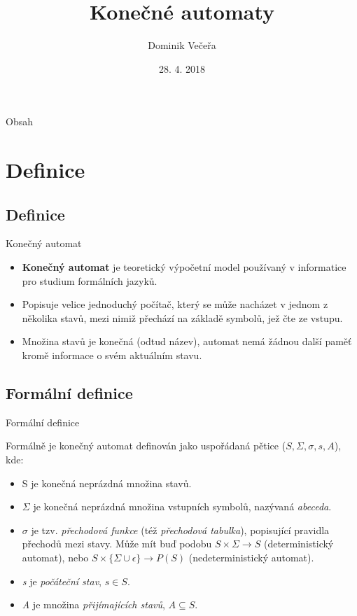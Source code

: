\documentclass[utf8x]{beamer}
\title{Konečné automaty}
\author{Dominik Večeřa}
\date{28. 4. 2018}
\institute[Brno University of Technology]
\begin{document}
\begin{frame}
  \titlepage
\end{frame}

\begin{frame}{Obsah}
  \tableofcontents
\end{frame}

\section{Definice}

\subsection{Definice}

\begin{frame}{Konečný automat}
  \begin{itemize}[<+->]
  \item {
    \textbf{Konečný automat} je teoretický výpočetní model používaný v informatice pro studium formálních jazyků.
  }
  \item {
    Popisuje velice jednoduchý počítač, který se může nacházet v jednom z několika stavů, mezi nimiž přechází na základě symbolů, jež čte ze vstupu.
  }
  \item{
    Množina stavů je konečná (odtud název), automat nemá žádnou další paměť kromě informace o svém aktuálním stavu.
  }
  \end{itemize}
\end{frame}

\subsection{Formální definice}

\begin{frame}{Formální definice}

  Formálně je konečný automat definován jako uspořádaná pětice ($S,\Sigma,\sigma,s,A$), kde:
  \pause
    
  \begin{itemize}[<+->]
  \item {   
    S je konečná neprázdná množina stavů.
  }
  \item {   
    $\Sigma$ je konečná neprázdná množina vstupních symbolů, nazývaná \textit{abeceda}.
  }
  \item {   
    $\sigma$ je tzv. \textit{přechodová funkce} (též \textit{přechodová tabulka}), popisující pravidla přechodů mezi stavy. Může mít buď podobu $S \times \Sigma \rightarrow S$ (deterministický automat), nebo $S \times \{\Sigma \cup \epsilon\} \rightarrow P(S)$ (nedeterministický automat).
  }
  \item {   
    \textit{s} je \textit{počáteční stav}, $s \in S$.
  }
  \item {   
    \textit{A} je množina \textit{přijímajících stavů}, $A \subseteq S$.
  }
  \end{itemize}
\end{frame}
\end{document}
